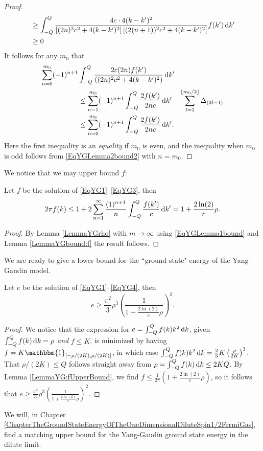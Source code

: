 \begin{proof}
\begin{equation}
\begin{aligned}
&\geq \int_{-Q}^{Q}\frac{4c\cdot 4(k-k')^2}{\left[(2n)^2c^2+4(k-k')^2\right]\left[(2(n+1))^2c^2+4(k-k')^2\right]} f(k')\mathop{}\!\mathrm{d} k'\\
&\geq 0
\end{aligned}
\end{equation}
It follows for any $ m_0 $ that \begin{equation}
\begin{aligned}
\sum_{n=0}^{m_0}(-1)^{n+1}&\int_{-Q}^{Q}\frac{2c(2n) f(k')}{((2n)^2c^2+4(k-k')^2)}\mathop{}\!\mathrm{d} k'\\
&\leq\sum_{n=1}^{m_0}(-1)^{n+1}\int_{-Q}^{Q}\frac{2 f(k')}{2nc}\mathop{}\!\mathrm{d} k'-\sum_{l=1}^{\left\lfloor m_0/2 \right\rfloor}\Delta_{(2l-1)}
\\
&\leq \sum_{n=0}^{m_0}(-1)^{n+1}\int_{-Q}^{Q}\frac{2 f(k')}{2nc}\mathop{}\!\mathrm{d} k'.
\end{aligned}
\end{equation}
Here the first inequality is an \emph{equality} if $ m_0 $ is even, and the inequality when $ m_0 $ is odd follows from \eqref{EqYGLemma2bound2} with $ n=m_0 $.
\end{proof}
 We notice that we may upper bound $ f $:
 \begin{lemma}\label{LemmaYG:fUpperBound}
 	Let $ f $ be the solution of \eqref{EqYG1}--\eqref{EqYG3}, then
 	\begin{equation}
 	\begin{aligned}
 	2\pi  f(k) \leq 1+2\sum_{n=1}^{\infty}\frac{(1)^{n+1}}{n}\int_{-Q}^{Q}\frac{ f(k')}{c}\mathop{}\!\mathrm{d} k'=1+\frac{2\ln(2)}{c} \rho.
 	\end{aligned}
 	\end{equation}
 \end{lemma}
\begin{proof}
	By Lemma \ref{LemmaYGrho} with $ m\to\infty $ using \eqref{EqYGLemma1bound} and Lemma \ref{LemmaYGbound:f} the result follows. 
\end{proof}
We are ready to give a lower bound for the ``ground state" energy of the Yang-Gaudin model. 
\begin{proposition}\label{PropositionYGLowerBound}
	Let $ e $ be the solution of \eqref{EqYG1}--\eqref{EqYG4}, then\begin{equation}
	e\geq \frac{\pi^2}{3}\rho ^3\left(\frac{1}{1+\frac{2\ln(2)}{c}\rho}\right)^2.
	\end{equation}
\end{proposition}
\begin{proof}
	We notice that the expression for $ e=\int_{-Q}^{Q}f(k)k^2\mathop{}\!\mathrm{d} k $, given $ \int_{-Q}^{Q}f(k)\mathop{}\!\mathrm{d} k=\rho $ \emph{and} $ f\leq K $, is minimized by having $ f=K\mathbbm{1}_{[-\rho/(2K),\rho /(2K)]} $, in which case $ \int_{-Q}^{Q}f(k)k^2\mathop{}\!\mathrm{d} k=\frac{2}{3}K\left(\frac{\rho}{2K}\right)^3 $. That $ \rho/(2K)\leq Q $ follows straight away from $ \rho =\int_{-Q}^{Q}f(k)\mathop{}\!\mathrm{d} k \leq 2KQ $.
	By Lemma \ref{LemmaYG:fUpperBound}, we find $ f\leq \frac{1}{2\pi}\left(1+\frac{2\ln(2)}{c}\rho\right) $, so it follows that $ e\geq \frac{\pi^2}{3}\rho ^3\left(\frac{1}{1+\frac{2\ln(2)}{c}\rho}\right)^2 $.
\end{proof}
We will, in Chapter \ref{ChapterTheGroundStateEnergyOfTheOneDimensionalDiluteSpin1/2FermiGas}, find a matching upper bound for the Yang-Gaudin ground state energy in the dilute limit.
